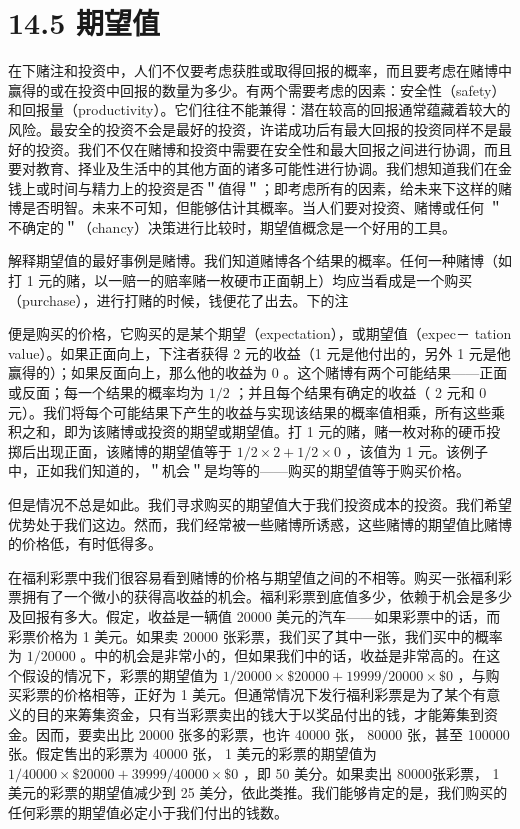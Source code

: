 \section*{14.5 期望值}
在下赌注和投资中，人们不仅要考虑获胜或取得回报的概率，而且要考虑在赌博中赢得的或在投资中回报的数量为多少。有两个需要考虑的因素：安全性（safety）和回报量（productivity）。它们往往不能兼得：潜在较高的回报通常蕴藏着较大的风险。最安全的投资不会是最好的投资，许诺成功后有最大回报的投资同样不是最好的投资。我们不仅在赌博和投资中需要在安全性和最大回报之间进行协调，而且要对教育、择业及生活中的其他方面的诸多可能性进行协调。我们想知道我们在金钱上或时间与精力上的投资是否＂值得＂；即考虑所有的因素，给未来下这样的赌博是否明智。未来不可知，但能够估计其概率。当人们要对投资、赌博或任何 ＂不确定的＂（chancy）决策进行比较时，期望值概念是一个好用的工具。

解释期望值的最好事例是赌博。我们知道赌博各个结果的概率。任何一种赌博（如打 1 元的赌，以一赔一的赔率赌一枚硬市正面朝上）均应当看成是一个购买（purchase），进行打赌的时候，钱便花了出去。下的注

便是购买的价格，它购买的是某个期望（expectation），或期望值（expec－ tation value）。如果正面向上，下注者获得 2 元的收益（1 元是他付出的，另外 1 元是他赢得的）；如果反面向上，那么他的收益为 0 。这个赌博有两个可能结果——正面或反面；每一个结果的概率均为 $1 / 2$ ；并且每个结果有确定的收益（ 2 元和 0 元）。我们将每个可能结果下产生的收益与实现该结果的概率值相乘，所有这些乘积之和，即为该赌博或投资的期望或期望值。打 1 元的赌，赌一枚对称的硬币投掷后出现正面，该赌博的期望值等于 $1 / 2 \times 2+1 / 2 \times 0$ ，该值为 1 元。该例子中，正如我们知道的，＂机会＂是均等的——购买的期望值等于购买价格。

但是情况不总是如此。我们寻求购买的期望值大于我们投资成本的投资。我们希望优势处于我们这边。然而，我们经常被一些赌博所诱惑，这些赌博的期望值比赌博的价格低，有时低得多。

在福利彩票中我们很容易看到赌博的价格与期望值之间的不相等。购买一张福利彩票拥有了一个微小的获得高收益的机会。福利彩票到底值多少，依赖于机会是多少及回报有多大。假定，收益是一辆值 20000 美元的汽车——如果彩票中的话，而彩票价格为 1 美元。如果卖 20000 张彩票，我们买了其中一张，我们买中的概率为 $1 / 20000$ 。中的机会是非常小的，但如果我们中的话，收益是非常高的。在这个假设的情况下，彩票的期望值为 $1 / 20000 \times \$ 20000+19999 / 20000 \times \$ 0$ ，与购买彩票的价格相等，正好为 1 美元。但通常情况下发行福利彩票是为了某个有意义的目的来筹集资金，只有当彩票卖出的钱大于以奖品付出的钱，才能筹集到资金。因而，要卖出比 20000 张多的彩票，也许 40000 张， 80000 张，甚至 100000 张。假定售出的彩票为 40000 张， 1 美元的彩票的期望值为 $1 / 40000 \times \$ 20000+39999 / 40000 \times \$ 0$ ，即 50 美分。如果卖出 80000张彩票， 1 美元的彩票的期望值减少到 25 美分，依此类推。我们能够肯定的是，我们购买的任何彩票的期望值必定小于我们付出的钱数。

